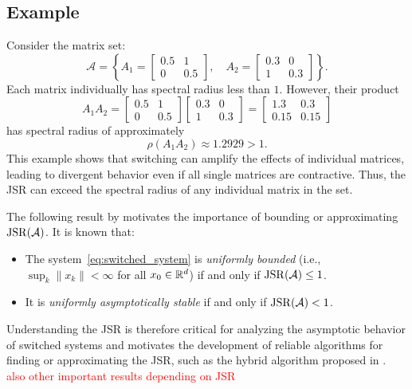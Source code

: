 \subsection*{Example}

Consider the matrix set:
\[
\mathcal{A} = \left\{ A_1 = 
\begin{bmatrix}
0.5 & 1 \\
0 & 0.5
\end{bmatrix}, \quad
A_2 =
\begin{bmatrix}
0.3 & 0 \\
1 & 0.3
\end{bmatrix}
\right\}.
\]
Each matrix individually has spectral radius less than $1$. However, their product
\[
A_1 A_2 =
\begin{bmatrix}
0.5 & 1 \\
0 & 0.5
\end{bmatrix}
\begin{bmatrix}
0.3 & 0 \\
1 & 0.3
\end{bmatrix}
=
\begin{bmatrix}
1.3 & 0.3 \\
0.15 & 0.15
\end{bmatrix}
\]
has spectral radius of approximately
\[
\rho(A_1 A_2) \approx 1.2929 > 1.
\]
This example shows that switching can amplify the effects of individual matrices, leading to divergent behavior even if all single matrices are contractive. Thus, the JSR can exceed the spectral radius of any individual matrix in the set.

The following result by \citep{blondelSurveyComputationalComplexity2000} motivates the importance of bounding or approximating $\operatorname{JSR}(\mathcal{A})$. It is known that:
\begin{samepage}
    \begin{itemize}
        \item The system~\eqref{eq:switched_system} is \emph{uniformly bounded} (i.e., $\sup_k \|x_k\| < \infty$ for all $x_0 \in \mathbb{R}^d$) if and only if $\operatorname{JSR}(\mathcal{A}) \leq 1$.
        \item It is \emph{uniformly asymptotically stable} if and only if $\operatorname{JSR}(\mathcal{A}) < 1$. 
    \end{itemize}
\end{samepage}

Understanding the JSR is therefore critical for analyzing the asymptotic behavior of switched systems and motivates the development of reliable algorithms for finding or approximating the JSR, such as the hybrid algorithm proposed in \citep{mejstrikHybridApproachJoint2024}.
\textcolor{red}{also other important results depending on JSR}

